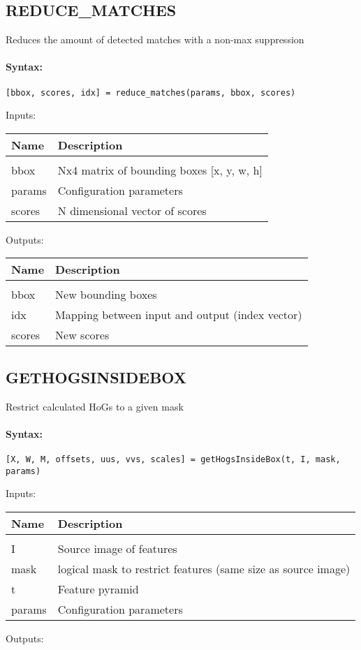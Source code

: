 \subsection{REDUCE\_MATCHES}

Reduces the amount of detected matches with a non-max suppression

\paragraph{Syntax:} \verb|[bbox, scores, idx] = reduce_matches(params, bbox, scores)|

Inputs:

\begin{tabular}{|l|p{5cm}|}
\hline
\textbf{Name} & \textbf{Description} \\
\hline \hline \\
bbox & Nx4 matrix of bounding boxes [x, y, w, h]  \\ \hline
params & Configuration parameters  \\ \hline
scores & N dimensional vector of scores  \\ \hline
\end{tabular}
Outputs:

\begin{tabular}{|l|p{5cm}|}
\hline
\textbf{Name} & \textbf{Description} \\
\hline \hline \\
bbox & New bounding boxes  \\ \hline
idx & Mapping between input and output (index vector)  \\ \hline
scores & New scores  \\ \hline
\end{tabular}

\subsection{GETHOGSINSIDEBOX}

Restrict calculated HoGs to a given mask

\paragraph{Syntax:} \verb|[X, W, M, offsets, uus, vvs, scales] = getHogsInsideBox(t, I, mask, params)|

Inputs:

\begin{tabular}{|l|p{5cm}|}
\hline
\textbf{Name} & \textbf{Description} \\
\hline \hline \\
I & Source image of features  \\ \hline
mask & logical mask to restrict features (same size as source image)  \\ \hline
t & Feature pyramid  \\ \hline
params & Configuration parameters  \\ \hline
\end{tabular}
Outputs:

